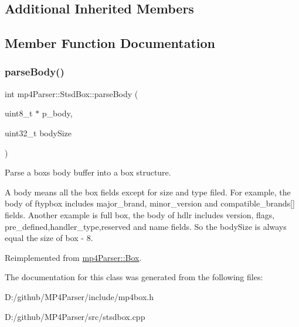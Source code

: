 \subsection*{Additional Inherited Members}


\subsection{Member Function Documentation}
\mbox{\label{classmp4_parser_1_1_stsd_box_af748ed2c67e55eddae676e4dab286a95}} 
\subsubsection{\texorpdfstring{parseBody()}{parseBody()}}
{\footnotesize\ttfamily int mp4\+Parser\+::\+Stsd\+Box\+::parse\+Body (\begin{DoxyParamCaption}\item[{uint8\+\_\+t $\ast$}]{p\+\_\+body,  }\item[{uint32\+\_\+t}]{body\+Size }\end{DoxyParamCaption})\hspace{0.3cm}{\ttfamily [virtual]}}



Parse a box\textquotesingle{}s body buffer into a box structure. 

A body means all the box fields except for size and type filed. For example, the body of ftypbox includes major\+\_\+brand, minor\+\_\+version and compatible\+\_\+brands\mbox{[}\mbox{]} fields. Another example is full box, the body of hdlr includes version, flags, pre\+\_\+defined,handler\+\_\+type,reserved and name fields. So the body\+Size is always equal the size of box -\/ 8. 

Reimplemented from \mbox{\hyperlink{classmp4_parser_1_1_box_a3dd0c084ac65bc77b69ac5ecaf796cb2}{mp4\+Parser\+::\+Box}}.



The documentation for this class was generated from the following files\+:\begin{DoxyCompactItemize}
\item 
D\+:/github/\+M\+P4\+Parser/include/mp4box.\+h\item 
D\+:/github/\+M\+P4\+Parser/src/stsdbox.\+cpp\end{DoxyCompactItemize}
